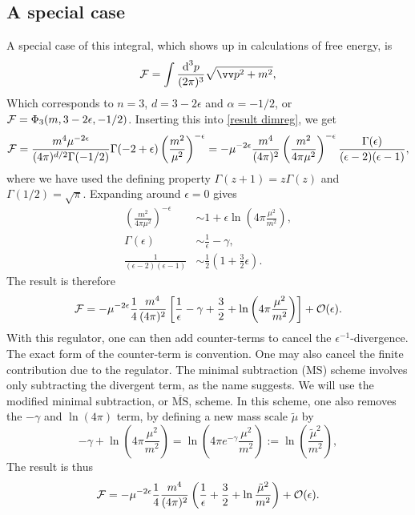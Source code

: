 \subsection{A special case}
\label{subsection: free energy integral}

A special case of this integral, which shows up in calculations of free energy, is 
%
\begin{equation}
    \Eff = \int \frac{\dd^3 p}{(2 \pi)^3} \sqrt{\vv p^2 + m^2},
\end{equation}
%
Which corresponds to $n=3$, $d = 3 - 2\epsilon$ and $\alpha = -1/2$, or $\mathcal{F} = \Phi_3(m, 3 - 2\epsilon, -1/2)$.
Inserting this into \autoref{result dimreg}, we get
%
\begin{equation}
    \mathcal{F}
    =
    \frac{m^4 \mu^{-2\epsilon}}{(4 \pi)^{d/2}\Gamma(-1/2)} \Gamma(-2 + \epsilon) \left(\frac{m^2}{\mu^2}\right)^{-\epsilon}
    =
    - \mu^{-2\epsilon} \frac{m^4}{(4 \pi)^{2}}
    \left(\frac{m^2}{4 \pi \mu^2}\right)^{- \epsilon}
    \frac{\Gamma(\epsilon)}{(\epsilon - 2)(\epsilon - 1)},
\end{equation}
%
where we have used the defining property $\Gamma(z + 1) = z\Gamma(z)$ and $\Gamma(1/2) = \sqrt \pi$.
Expanding around $\epsilon = 0$ gives
%
\begin{align}
    \left(\frac{m^2}{4 \pi \mu^2}\right)^{- \epsilon}
    &\sim 1 + \epsilon \ln\left(4 \pi \frac{\mu^2}{m^2}\right),\\
    \Gamma(\epsilon) 
    & \sim \frac{1}{\epsilon} - \gamma, \\
    \frac{1}{(\epsilon - 2)(\epsilon - 1)}
    &\sim \frac{1}{2}\left(1 + \frac{3}{2} \epsilon\right).
\end{align}
%
The result is therefore
%
\begin{align}
    \mathcal{F} =
    - \mu^{-2\epsilon} \frac{1}{4}\frac{m^4}{(4 \pi)^2}
    \left[
        \frac{1}{\epsilon} 
        - \gamma + \frac{3}{2}
        + \ln\left(4 \pi \frac{\mu^2}{m^2}\right)
    \right]
    + \mathcal O(\epsilon).
\end{align}
%
With this regulator, one can then add counter-terms to cancel the $\epsilon^{-1}$-divergence.
The exact form of the counter-term is convention.
One may also cancel the finite contribution due to the regulator.
The minimal subtraction ($\mathrm{MS}$) scheme involves only subtracting the divergent term, as the name suggests.
We will use the modified minimal subtraction, or $\overline{ \mathrm{MS}}$, scheme.
In this scheme, one also removes the $-\gamma$ and $\ln(4 \pi)$ term, by defining a new mass scale $\tilde \mu$ by
\begin{equation}
    \label{definition mu tilde MS bar}
    -\gamma + \ln\left(4\pi \frac{\mu^2}{m^2}\right) 
    = \ln\left(4\pi e^{-\gamma} \frac{\mu^2}{m^2}\right) 
    := \ln\left(\frac{\tilde\mu^2}{m^2}\right),
\end{equation}
The result is thus
\begin{equation}
    \mathcal{F} =
    - \mu^{-2\epsilon} \frac{1}{4}\frac{m^4}{(4 \pi)^2}
    \left(
        \frac{1}{\epsilon} 
        + \frac{3}{2}
        + \ln \frac{\tilde\mu^2}{m^2}
    \right)
    + \mathcal O(\epsilon).
\end{equation}



